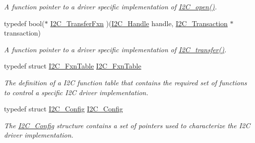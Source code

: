 \begin{DoxyCompactItemize}
\begin{DoxyCompactList}\small\item\em A function pointer to a driver specific implementation of \hyperlink{_i2_c_8h_ae1aa99e1fee4517406018e10025cca0e}{I2\-C\-\_\-open()}. \end{DoxyCompactList}\item 
typedef bool($\ast$ \hyperlink{_i2_c_8h_a25199ad36e7bcf7def0d7e0ab2063a4b}{I2\-C\-\_\-\-Transfer\-Fxn} )(\hyperlink{_i2_c_8h_a5809a229f8395c87f59e63128195c1bf}{I2\-C\-\_\-\-Handle} handle, \hyperlink{struct_i2_c___transaction}{I2\-C\-\_\-\-Transaction} $\ast$transaction)
\begin{DoxyCompactList}\small\item\em A function pointer to a driver specific implementation of \hyperlink{_i2_c_8h_ac5d827b67fe77d7d179026941cc069d7}{I2\-C\-\_\-transfer()}. \end{DoxyCompactList}\item 
typedef struct \hyperlink{struct_i2_c___fxn_table}{I2\-C\-\_\-\-Fxn\-Table} \hyperlink{_i2_c_8h_abdc2b5945fac9724271b088437881d68}{I2\-C\-\_\-\-Fxn\-Table}
\begin{DoxyCompactList}\small\item\em The definition of a I2\-C function table that contains the required set of functions to control a specific I2\-C driver implementation. \end{DoxyCompactList}\item 
typedef struct \hyperlink{struct_i2_c___config}{I2\-C\-\_\-\-Config} \hyperlink{_i2_c_8h_a06eeddd0e8a5dd24a18566b65099d588}{I2\-C\-\_\-\-Config}
\begin{DoxyCompactList}\small\item\em The \hyperlink{struct_i2_c___config}{I2\-C\-\_\-\-Config} structure contains a set of pointers used to characterize the I2\-C driver implementation. \end{DoxyCompactList}\end{DoxyCompactItemize}
